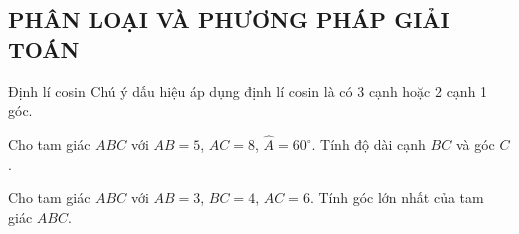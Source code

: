 \subsection{PHÂN LOẠI VÀ PHƯƠNG PHÁP GIẢI TOÁN}
\begin{dang}{Định lí cosin}
	Chú ý dấu hiệu áp dụng định lí cosin là có 3 cạnh hoặc 2 cạnh 1 góc.
\end{dang}
\begin{vd}%
	Cho tam giác $ABC$ với $AB=5$, $AC=8$, $\widehat{A}=60^{\circ}$. Tính độ dài cạnh $B C$ và góc $C$.
\end{vd}
\begin{vd}
	Cho tam giác $ABC$ với $AB=3$, $BC=4$, $AC=6$. Tính góc lớn nhất của tam giác $ABC$.
\end{vd}
